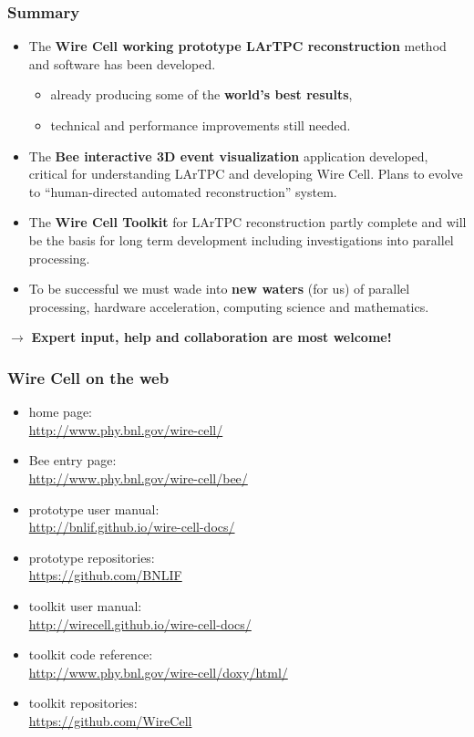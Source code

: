\documentclass[xcolor=dvipsnames]{beamer}
\begin{document}
\begin{frame}
  \frametitle{Summary}
  \footnotesize
  \begin{itemize}
  \item The \textbf{Wire Cell working prototype LArTPC reconstruction} method and software has been developed.
    \begin{itemize}  \footnotesize
    \item already producing some of the \textbf{world's best results},
    \item technical and performance improvements still needed.
    \end{itemize}
  \item The \textbf{Bee interactive 3D event visualization}
    application developed, critical for understanding LArTPC and
    developing Wire Cell.  Plans to evolve to ``human-directed
    automated reconstruction'' system.
  \item The \textbf{Wire Cell Toolkit} for LArTPC reconstruction
    partly complete and will be the basis for long term development
    including investigations into parallel processing.
  \item To be successful we must wade into \textbf{new waters} (for
    us) of parallel processing, hardware acceleration, computing
    science and mathematics.
  \end{itemize}

  \begin{center}
    $\rightarrow$ \textbf{Expert input, help and collaboration are most welcome!}
  \end{center}
\end{frame}

\begin{frame}
  \frametitle{Wire Cell on the web}

  \begin{itemize}
  \item home page: \\ \url{http://www.phy.bnl.gov/wire-cell/}
  \item Bee entry page: \\ \url{http://www.phy.bnl.gov/wire-cell/bee/}
  \item prototype user manual: \\ \url{http://bnlif.github.io/wire-cell-docs/}
  \item prototype repositories: \\ \url{https://github.com/BNLIF}
  \item toolkit user manual: \\ \url{http://wirecell.github.io/wire-cell-docs/}
  \item toolkit code reference: \\ \url{http://www.phy.bnl.gov/wire-cell/doxy/html/}
  \item toolkit repositories: \\ \url{https://github.com/WireCell}
  \end{itemize}
\end{frame}
\end{document}
